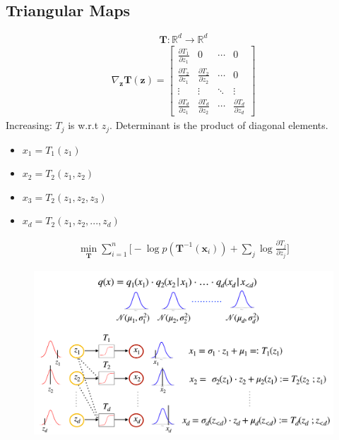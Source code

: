 \subsection{Triangular Maps}
$$\mathbf{T}: \mathbb{R}^d \rightarrow \mathbb{R}^d$$
\begin{align*}
    \nabla_{\mathbf{z}}\mathbf{T}(\mathbf{z})  = \begin{bmatrix}
    \frac{\partial T_1}{\partial z_1} & 0 &\cdots & 0\\
    \frac{\partial T_2}{\partial z_1} &\frac{\partial T_2}{\partial z_2} &\cdots & 0\\
    \vdots& \vdots &\ddots &\vdots\\
    \frac{\partial T_d}{\partial z_1} &\frac{\partial T_d}{\partial z_2} &\cdots &\frac{\partial T_d}{\partial z_d} 
 \end{bmatrix}
\end{align*}
Increasing: $T_j$ is w.r.t $z_j$. Determinant is the product of diagonal elements.
\begin{itemize}
    \item $x_1 = T_1(z_1)$
    \item $x_2 = T_2(z_1, z_2)$
    \item $x_3 = T_2(z_1, z_2, z_3)$
    \item $x_d = T_2(z_1, z_2, ..., z_d)$
\end{itemize}
\begin{align*}
    \min_{\mathbf{T}}\sum_{i=1}^{n} \Bigg[-\log p(\mathbf{T}^{-1}(\mathbf{x}_i)) + \sum_{j}\log \frac{\partial T_j}{\partial z_j}\Bigg] 
\end{align*}

\begin{figure}[t]
	\centering
	\includegraphics[scale=0.30]{./images/generative/flows/nmf.png}
\end{figure}

